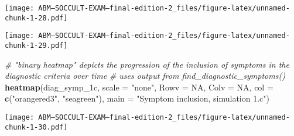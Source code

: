 \documentclass[]{article}
\newenvironment{Shaded}{\begin{snugshade}}{\end{snugshade}}
\newcommand{\KeywordTok}[1]{\textcolor[rgb]{0.13,0.29,0.53}{\textbf{#1}}}
\newcommand{\DataTypeTok}[1]{\textcolor[rgb]{0.13,0.29,0.53}{#1}}
\newcommand{\DecValTok}[1]{\textcolor[rgb]{0.00,0.00,0.81}{#1}}
\newcommand{\StringTok}[1]{\textcolor[rgb]{0.31,0.60,0.02}{#1}}
\newcommand{\CommentTok}[1]{\textcolor[rgb]{0.56,0.35,0.01}{\textit{#1}}}
\newcommand{\OtherTok}[1]{\textcolor[rgb]{0.56,0.35,0.01}{#1}}
\newcommand{\OperatorTok}[1]{\textcolor[rgb]{0.81,0.36,0.00}{\textbf{#1}}}
\newcommand{\NormalTok}[1]{#1}
\begin{document}
\texttt{[image: ABM---SOCCULT-EXAM---final-edition-2\_files/figure-latex/unnamed-chunk-1-28.pdf]}

\begin{Shaded}
\end{Shaded}

\texttt{[image: ABM---SOCCULT-EXAM---final-edition-2\_files/figure-latex/unnamed-chunk-1-29.pdf]}

\begin{Shaded}
\begin{Highlighting}[]
\CommentTok{# "binary heatmap" depicts the progression of the inclusion of symptoms in the diagnostic criteria over time}
\CommentTok{# uses output from find_diagnostic_symptoms()}
\KeywordTok{heatmap}\NormalTok{(diag_symp_1c, }\DataTypeTok{scale =} \StringTok{"none"}\NormalTok{, }\DataTypeTok{Rowv =} \OtherTok{NA}\NormalTok{, }\DataTypeTok{Colv =} \OtherTok{NA}\NormalTok{, }\DataTypeTok{col =} \KeywordTok{c}\NormalTok{(}\StringTok{"orangered3"}\NormalTok{, }\StringTok{"seagreen"}\NormalTok{), }\DataTypeTok{main =} \StringTok{"Symptom inclusion, simulation 1.c"}\NormalTok{) }
\end{Highlighting}
\end{Shaded}

\texttt{[image: ABM---SOCCULT-EXAM---final-edition-2\_files/figure-latex/unnamed-chunk-1-30.pdf]}
\end{document}
